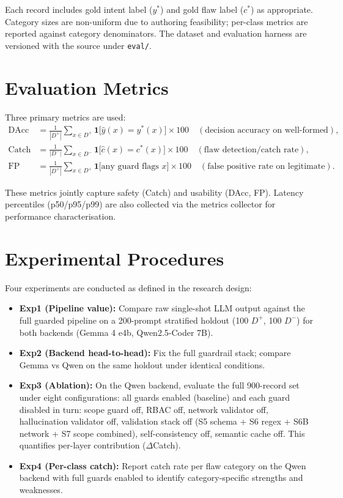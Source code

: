 Each record includes gold intent label ($y^*$) and gold flaw label ($c^*$) as appropriate. Category sizes are non-uniform due to authoring feasibility; per-class metrics are reported against category denominators. The dataset and evaluation harness are versioned with the source under \texttt{eval/}.

\section{Evaluation Metrics}\label{sec:method-metrics}

Three primary metrics are used:
\begin{align}
\mathrm{DAcc} &= \frac{1}{|D^+|}\sum_{x\in D^+}\mathbf{1}\!\big[\hat{y}(x)=y^\ast(x)\big]\times 100\quad (\text{decision accuracy on well-formed}),\\[4pt]
\mathrm{Catch} &= \frac{1}{|D^-|}\sum_{x\in D^-}\mathbf{1}\!\big[\hat{c}(x)=c^\ast(x)\big]\times 100\quad (\text{flaw detection/catch rate}),\\[4pt]
\mathrm{FP} &= \frac{1}{|D^+|}\sum_{x\in D^+}\mathbf{1}\!\big[\text{any guard flags }x\big]\times 100\quad (\text{false positive rate on legitimate}).
\end{align}

These metrics jointly capture safety (Catch) and usability (DAcc, FP). Latency percentiles (p50/p95/p99) are also collected via the metrics collector for performance characterisation.

\section{Experimental Procedures}\label{sec:method-experiments}

Four experiments are conducted as defined in the research design:

\begin{itemize}
  \item \textbf{Exp1 (Pipeline value):} Compare raw single-shot LLM output against the full guarded pipeline on a 200-prompt stratified holdout (100 $D^+$, 100 $D^-$) for both backends (Gemma 4 e4b, Qwen2.5-Coder 7B).
  \item \textbf{Exp2 (Backend head-to-head):} Fix the full guardrail stack; compare Gemma vs Qwen on the same holdout under identical conditions.
  \item \textbf{Exp3 (Ablation):} On the Qwen backend, evaluate the full 900-record set under eight configurations: all guards enabled (baseline) and each guard disabled in turn: scope guard off, RBAC off, network validator off, hallucination validator off, validation stack off (S5 schema + S6 regex + S6B network + S7 scope combined), self-consistency off, semantic cache off. This quantifies per-layer contribution ($\Delta$Catch).
  \item \textbf{Exp4 (Per-class catch):} Report catch rate per flaw category on the Qwen backend with full guards enabled to identify category-specific strengths and weaknesses.
\end{itemize}

